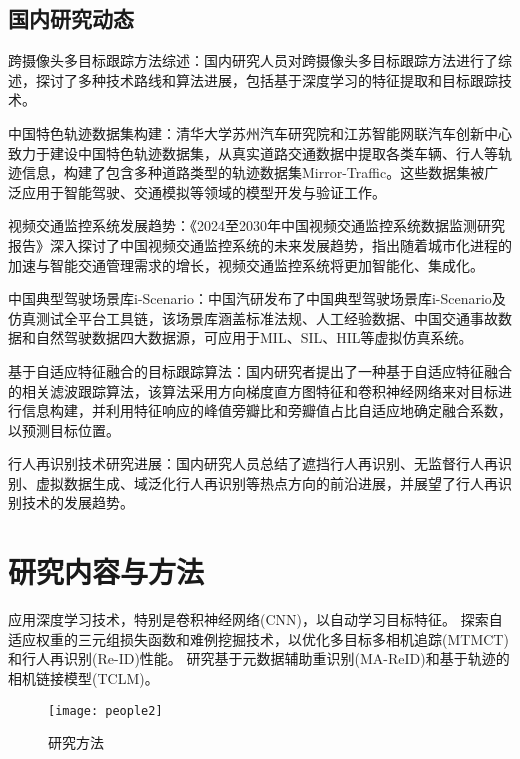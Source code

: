 \subsection{国内研究动态}

跨摄像头多目标跟踪方法综述：国内研究人员对跨摄像头多目标跟踪方法进行了综述，探讨了多种技术路线和算法进展，包括基于深度学习的特征提取和目标跟踪技术\cite{zhou2020tracking}。

中国特色轨迹数据集构建：清华大学苏州汽车研究院和江苏智能网联汽车创新中心致力于建设中国特色轨迹数据集，从真实道路交通数据中提取各类车辆、行人等轨迹信息，构建了包含多种道路类型的轨迹数据集Mirror-Traffic。这些数据集被广泛应用于智能驾驶、交通模拟等领域的模型开发与验证工作\cite{bewley2016simple}。

视频交通监控系统发展趋势：《2024至2030年中国视频交通监控系统数据监测研究报告》深入探讨了中国视频交通监控系统的未来发展趋势，指出随着城市化进程的加速与智能交通管理需求的增长，视频交通监控系统将更加智能化、集成化\cite{韩炳庆 2018 智能交通场景中的多目标跟踪算法研究}。

中国典型驾驶场景库i-Scenario：中国汽研发布了中国典型驾驶场景库i-Scenario及仿真测试全平台工具链，该场景库涵盖标准法规、人工经验数据、中国交通事故数据和自然驾驶数据四大数据源，可应用于MIL、SIL、HIL等虚拟仿真系统。

基于自适应特征融合的目标跟踪算法：国内研究者提出了一种基于自适应特征融合的相关滤波跟踪算法，该算法采用方向梯度直方图特征和卷积神经网络来对目标进行信息构建，并利用特征响应的峰值旁瓣比和旁瓣值占比自适应地确定融合系数，以预测目标位置。

行人再识别技术研究进展：国内研究人员总结了遮挡行人再识别、无监督行人再识别、虚拟数据生成、域泛化行人再识别等热点方向的前沿进展，并展望了行人再识别技术的发展趋势\cite{kalman1960new}。

\section{研究内容与方法}

应用深度学习技术，特别是卷积神经网络(CNN)，以自动学习目标特征。
探索自适应权重的三元组损失函数和难例挖掘技术，以优化多目标多相机追踪(MTMCT)和行人再识别(Re-ID)性能\cite{choi2020multiple}。
研究基于元数据辅助重识别(MA-ReID)和基于轨迹的相机链接模型(TCLM)。

\begin{figure}[htbp] %
	\centering
	\texttt{[image: people2]} %
	\caption{研究方法} %
	\label{fig:people2} %
\end{figure}

